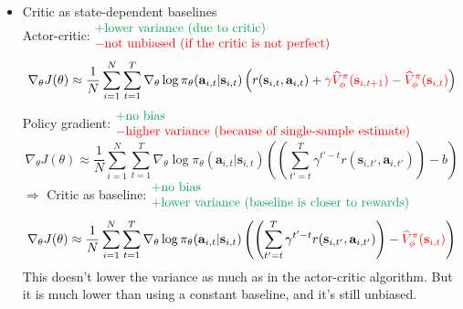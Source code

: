 \begin{itemize}
	\item Critic as state-dependent baselines\\
	Actor-critic: $\begin{matrix*}[l]
		\color{Green}+\text{lower variance (due to critic)}\\
		\color{red}-\text{not unbiased (if the critic is not perfect)}
	\end{matrix*}$
	\[\nabla_\theta J(\theta) \approx \frac{1}{N} \sum_{i=1}^N \sum_{t=1}^T \nabla_\theta\log\pi_{\theta}(\textbf{a}_{i,t}|\textbf{s}_{i,t}) \left( r(\textbf{s}_{i,t}, \textbf{a}_{i,t}) + {\color{red}\gamma\widehat{V}_\phi^\pi(\textbf{s}_{i,t+1}) - \widehat{V}_\phi^\pi(\textbf{s}_{i,t})} \right)\]
	Policy gradient: $\begin{matrix*}[l]
		\color{Green}+ \text{no bias}\\
		\color{red}- \text{higher variance (because of single-sample estimate)}
	\end{matrix*}$
	\[\nabla_\theta J(\theta) \approx \frac{1}{N} \sum_{i=1}^N \sum_{t=1}^T \nabla_\theta\log\pi_{\theta}(\textbf{a}_{i,t}|\textbf{s}_{i,t}) \left( \left( \sum_{t' = t}^T \gamma^{t'-t} r(\textbf{s}_{i,t'}, \textbf{a}_{i,t'}) \right) -b \right)\]
	$\Rightarrow$ Critic as baseline: $\color{Green}\begin{matrix*}[l]
		+ \text{no bias}\\
		+ \text{lower variance (baseline is closer to rewards)}
	\end{matrix*}$
	\[\nabla_\theta J(\theta) \approx \frac{1}{N} \sum_{i=1}^N \sum_{t=1}^T \nabla_\theta\log\pi_{\theta}(\textbf{a}_{i,t}|\textbf{s}_{i,t}) \left( \left( \sum_{t' = t}^T \gamma^{t'-t} r(\textbf{s}_{i,t'}, \textbf{a}_{i,t'}) \right) - {\color{red}\widehat{V}_\phi^\pi(\textbf{s}_{i,t})} \right)\]
	This doesn't lower the variance as much as in the actor-critic algorithm. But it is much lower than using a constant baseline, and it's still unbiased.
	

\end{itemize}
